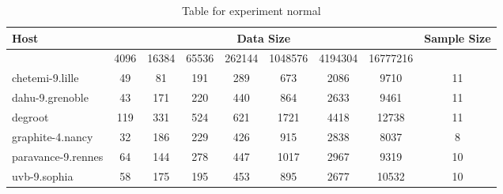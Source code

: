 \begin{table}
\caption{Table for experiment normal}
\begin{tabular}{@{}lcccccccc@{}}
\toprule
Host    & \multicolumn{7}{c}{Data Size}          & Sample Size \\ \midrule
& 4096  & 16384  & 65536  & 262144  & 1048576  & 4194304  & 16777216              \\ \midrule
chetemi-9.lille  & 49  & 81  & 191  & 289  & 673  & 2086  & 9710  & 11 \\
dahu-9.grenoble  & 43  & 171  & 220  & 440  & 864  & 2633  & 9461  & 11 \\
degroot  & 119  & 331  & 524  & 621  & 1721  & 4418  & 12738  & 11 \\
graphite-4.nancy  & 32  & 186  & 229  & 426  & 915  & 2838  & 8037  & 8 \\
paravance-9.rennes  & 64  & 144  & 278  & 447  & 1017  & 2967  & 9319  & 10 \\
uvb-9.sophia  & 58  & 175  & 195  & 453  & 895  & 2677  & 10532  & 10 \\
\bottomrule
\end{tabular}
\end{table}